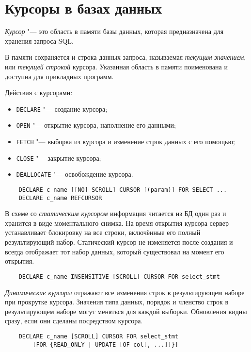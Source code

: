 \section{Курсоры в базах данных}

\begin{definition}
	\emph{Курсор} "--- это область в памяти базы данных, которая предназначена для хранения запроса SQL.
\end{definition}

В памяти сохраняется и строка данных запроса, называемая \emph{текущим значением}, или \emph{текущей строкой} курсора.
Указанная область в памяти поименована и доступна для прикладных программ.

Действия с курсорами:
\begin{itemize}
	\item \texttt{DECLARE} "--- создание курсора;
	\item \texttt{OPEN} "--- открытие курсора, \ie наполнение его данными;
	\item \texttt{FETCH} "--- выборка из курсора и изменение строк данных с его помощью;
	\item \texttt{CLOSE} "--- закрытие курсора;
	\item \texttt{DEALLOCATE} "--- освобождение курсора.
\end{itemize}

\begin{verbatim}
	DECLARE c_name [[NO] SCROLL] CURSOR [(param)] FOR SELECT ...
	DECLARE c_name REFCURSOR
\end{verbatim}

В схеме со \emph{статическим курсором} информация читается из БД один раз и хранится в виде моментального снимка.
На время открытия курсора сервер устанавливает блокировку на все строки, включённые его полный результирующий набор.
Статический курсор не изменяется после создания и всегда отображает тот набор данных, который существовал на момент его открытия.

\begin{verbatim}
	DECLARE c_name INSENSITIVE [SCROLL] CURSOR FOR select_stmt
\end{verbatim}

\emph{Динамические курсоры} отражают все изменения строк в результирующем наборе при прокрутке курсора.
Значения типа данных, порядок и членство строк в результирующем наборе могут меняться для каждой выборки.
Обновления видны сразу, если они сделаны посредством курсора.

\begin{verbatim}
	DECLARE c_name [SCROLL] CURSOR FOR select_stmt
		[FOR {READ_ONLY | UPDATE [OF col[, ...]]}]
\end{verbatim}

